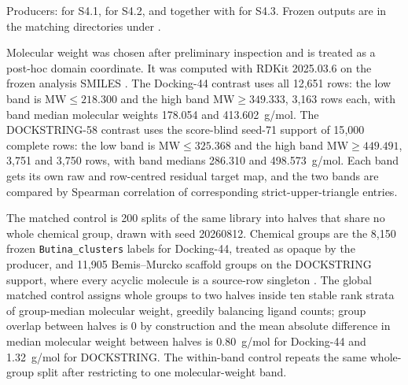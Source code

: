 
Producers:  for S4.1,
 for S4.2, and
 together with
 for S4.3. Frozen outputs are in the
matching directories under .


Molecular weight was chosen after preliminary inspection and is treated as a post-hoc domain
coordinate. It was computed with RDKit 2025.03.6 on the frozen analysis SMILES
\cite{rdkit2025}. The Docking-44 contrast uses all 12{,}651 rows: the low band is
$\mathrm{MW}\leq 218.300$ and the high band $\mathrm{MW}\geq 349.333$, 3{,}163 rows each, with
band median molecular weights 178.054 and 413.602~g/mol. The DOCKSTRING-58 contrast uses the
score-blind seed-71 support of 15{,}000 complete rows: the low band is
$\mathrm{MW}\leq 325.368$ and the high band $\mathrm{MW}\geq 449.491$, 3{,}751 and 3{,}750
rows, with band medians 286.310 and 498.573~g/mol. Each band gets its own raw and
row-centred residual target map, and the two bands are compared by Spearman correlation of
corresponding strict-upper-triangle entries.

The matched control is 200 splits of the same library into halves that share no whole chemical
group, drawn with seed 20260812. Chemical groups are the 8{,}150 frozen
\texttt{Butina\_clusters} labels for Docking-44, treated as opaque by the producer, and 11{,}905
Bemis--Murcko scaffold groups on the DOCKSTRING support, where every acyclic molecule is a
source-row singleton \cite{butina1999,murcko1996}. The global matched control assigns whole
groups to two halves inside ten stable rank strata of group-median molecular weight, greedily
balancing ligand counts; group overlap between halves is 0 by construction and the mean
absolute difference in median molecular weight between halves is 0.80~g/mol for Docking-44 and
1.32~g/mol for DOCKSTRING. The within-band control repeats the same whole-group split after
restricting to one molecular-weight band.

